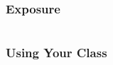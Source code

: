 \begin{frame}[fragile]
	\frametitle{Exposure}
	\begin{columns}[T]
		\begin{column}{0.5\textwidth}
			
		\end{column}
		\begin{column}{0.5\textwidth}
			
		\end{column}
	\end{columns}
\end{frame}

\begin{frame}
	\frametitle{Using Your Class}
	
\end{frame}